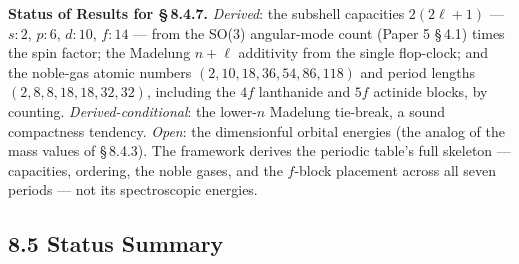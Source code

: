 \documentclass[11pt,oneside]{report}
\theoremstyle{definition}
\theoremstyle{remark}
\begin{document}
\textbf{Status of Results for \S\,8.4.7.} \emph{Derived}: the subshell
capacities \ensuremath{2(2\ell+1)} --- \ensuremath{s: 2}, \ensuremath{p: 6}, \ensuremath{d: 10}, \ensuremath{f: 14} --- from the SO(3)
angular-mode count (Paper 5 \S\,4.1) times the spin factor; the Madelung
\ensuremath{n + \ell} additivity from the single flop-clock; and the noble-gas atomic
numbers \ensuremath{(2, 10, 18, 36, 54, 86, 118)} and period lengths
\ensuremath{(2, 8, 8, 18, 18, 32, 32)}, including the \ensuremath{4f} lanthanide and \ensuremath{5f} actinide
blocks, by counting. \emph{Derived-conditional}: the lower-\ensuremath{n} Madelung
tie-break, a sound compactness tendency. \emph{Open}: the dimensionful orbital
energies (the analog of the mass values of \S\,8.4.3). The framework derives the
periodic table's full skeleton --- capacities, ordering, the noble gases, and the
\ensuremath{f}-block placement across all seven periods --- not its spectroscopic energies.

\subsection*{8.5 Status Summary}
\end{document}
